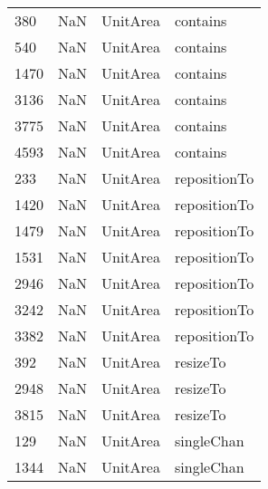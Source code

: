 \begin{tabular}{llll}
380  &                   NaN &                   UnitArea &                                  contains \\
540  &                   NaN &                   UnitArea &                                  contains \\
1470 &                   NaN &                   UnitArea &                                  contains \\
3136 &                   NaN &                   UnitArea &                                  contains \\
3775 &                   NaN &                   UnitArea &                                  contains \\
4593 &                   NaN &                   UnitArea &                                  contains \\
233  &                   NaN &                   UnitArea &                              repositionTo \\
1420 &                   NaN &                   UnitArea &                              repositionTo \\
1479 &                   NaN &                   UnitArea &                              repositionTo \\
1531 &                   NaN &                   UnitArea &                              repositionTo \\
2946 &                   NaN &                   UnitArea &                              repositionTo \\
3242 &                   NaN &                   UnitArea &                              repositionTo \\
3382 &                   NaN &                   UnitArea &                              repositionTo \\
392  &                   NaN &                   UnitArea &                                  resizeTo \\
2948 &                   NaN &                   UnitArea &                                  resizeTo \\
3815 &                   NaN &                   UnitArea &                                  resizeTo \\
129  &                   NaN &                   UnitArea &                                singleChan \\
1344 &                   NaN &                   UnitArea &                                singleChan \\

\end{tabular}
